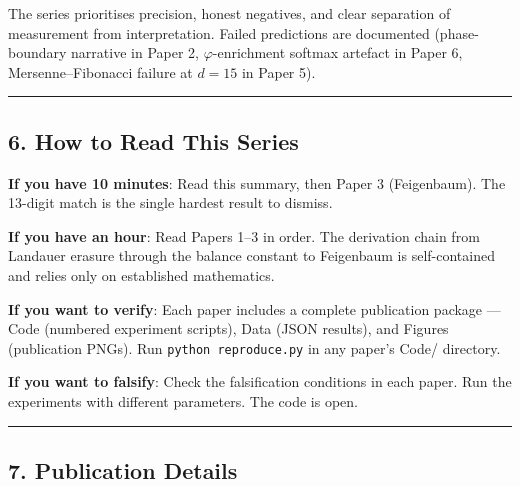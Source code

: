 \documentclass[
  11pt,
  a4paper]{article}
\begin{document}
The series prioritises precision, honest negatives, and clear separation
of measurement from interpretation. Failed predictions are documented
(phase-boundary narrative in Paper 2, \(\varphi\)-enrichment softmax
artefact in Paper 6, Mersenne--Fibonacci failure at \(d = 15\) in Paper
5).

\begin{center}\rule{0.5\linewidth}{0.5pt}\end{center}

\subsection{6. How to Read This Series}\label{how-to-read-this-series}

\textbf{If you have 10 minutes}: Read this summary, then Paper 3
(Feigenbaum). The 13-digit match is the single hardest result to
dismiss.

\textbf{If you have an hour}: Read Papers 1--3 in order. The derivation
chain from Landauer erasure through the balance constant to Feigenbaum
is self-contained and relies only on established mathematics.

\textbf{If you want to verify}: Each paper includes a complete
publication package --- Code (numbered experiment scripts), Data (JSON
results), and Figures (publication PNGs). Run
\texttt{python\ reproduce.py} in any paper's Code/ directory.

\textbf{If you want to falsify}: Check the falsification conditions in
each paper. Run the experiments with different parameters. The code is
open.

\begin{center}\rule{0.5\linewidth}{0.5pt}\end{center}

\subsection{7. Publication Details}\label{publication-details}
\end{document}
